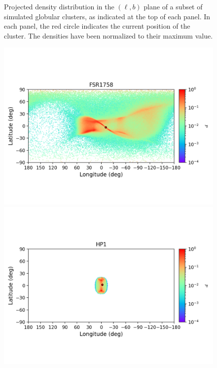 \begin{figure}
\begin{center}
            \end{center}
            \caption[]{Projected density distribution in the $(\ell, b)$ plane of a subset of simulated globular clusters, as indicated at the top of each panel. In each panel, the red circle indicates the current position of the cluster. The densities have been normalized to their maximum value.}
            \label{stream2}
        \end{figure}

        \begin{figure}
            \begin{center}
                \includegraphics[clip=true, trim = 0mm 20mm 0mm 10mm, width=1\columnwidth]{images/error_plots_FSR1758.png}
                \includegraphics[clip=true, trim = 0mm 20mm 0mm 10mm, width=1\columnwidth]{images/error_plots_HP1.png}
                

\end{center}
\end{figure}
